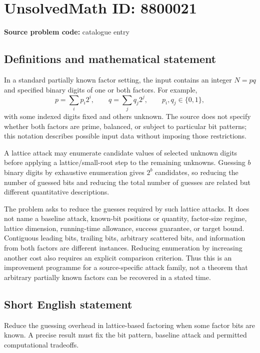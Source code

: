 \documentclass[11pt]{article}
\begin{document}
\section*{UnsolvedMath ID: 8800021}
\textbf{Source problem code:} catalogue entry
\subsection{Definitions and mathematical statement}
In a standard partially known factor setting, the input contains an integer $N=pq$ and specified binary digits of one or both factors. For example,
\[
p=\sum_i p_i2^i,\qquad q=\sum_j q_j2^j,\qquad p_i,q_j\in\{0,1\},
\]
with some indexed digits fixed and others unknown. The source does not specify whether both factors are prime, balanced, or subject to particular bit patterns; this notation describes possible input data without imposing those restrictions.

A lattice attack may enumerate candidate values of selected unknown digits before applying a lattice/small-root step to the remaining unknowns. Guessing $b$ binary digits by exhaustive enumeration gives $2^b$ candidates, so reducing the number of guessed bits and reducing the total number of guesses are related but different quantitative descriptions.

The problem asks to reduce the guesses required by such lattice attacks. It does not name a baseline attack, known-bit positions or quantity, factor-size regime, lattice dimension, running-time allowance, success guarantee, or target bound. Contiguous leading bits, trailing bits, arbitrary scattered bits, and information from both factors are different instances. Reducing enumeration by increasing another cost also requires an explicit comparison criterion. Thus this is an improvement programme for a source-specific attack family, not a theorem that arbitrary partially known factors can be recovered in a stated time.
\subsection{Short English statement}
Reduce the guessing overhead in lattice-based factoring when some factor bits are known. A precise result must fix the bit pattern, baseline attack and permitted computational tradeoffs.
\end{document}
